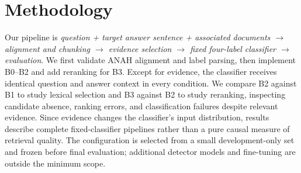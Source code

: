 \section{Methodology}
\label{section:method}
Our pipeline is \emph{question + target answer sentence + associated documents $\rightarrow$ alignment and chunking $\rightarrow$ evidence selection $\rightarrow$ fixed four-label classifier $\rightarrow$ evaluation}. We first validate ANAH alignment and label parsing, then implement B0--B2 and add reranking for B3. Except for evidence, the classifier receives identical question and answer context in every condition. We compare B2 against B1 to study lexical selection and B3 against B2 to study reranking, inspecting candidate absence, ranking errors, and classification failures despite relevant evidence. Since evidence changes the classifier's input distribution, results describe complete fixed-classifier pipelines rather than a pure causal measure of retrieval quality. The configuration is selected from a small development-only set and frozen before final evaluation; additional detector models and fine-tuning are outside the minimum scope.
